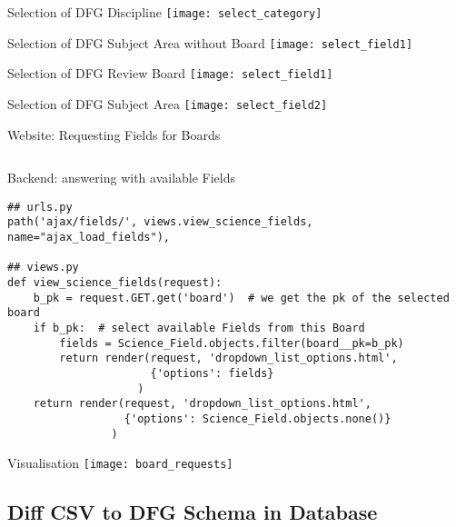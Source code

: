 
\begin{frame}[c]{Selection of DFG Discipline}
    \texttt{[image: select\_category]}
\end{frame}
\begin{frame}[c]{Selection of DFG Subject Area without Board}
    \texttt{[image: select\_field1]}
\end{frame}
\begin{frame}[c]{Selection of DFG Review Board}
    \texttt{[image: select\_field1]}
\end{frame}
\begin{frame}[c]{Selection of DFG Subject Area}
    \texttt{[image: select\_field2]}
\end{frame}


\begin{frame}[c,fragile]{Website: Requesting Fields for Boards}
    \footnotesize
    \inputminted[linenos=true]{javascript}{code/board_request.js}
\end{frame}


\begin{frame}[c,fragile]{Backend: answering with available Fields}
\footnotesize
    \begin{verbatim}
## urls.py
path('ajax/fields/', views.view_science_fields, name="ajax_load_fields"),

## views.py
def view_science_fields(request):
    b_pk = request.GET.get('board')  # we get the pk of the selected board
    if b_pk:  # select available Fields from this Board
        fields = Science_Field.objects.filter(board__pk=b_pk) 
        return render(request, 'dropdown_list_options.html',
                      {'options': fields}
                    )
    return render(request, 'dropdown_list_options.html',
                  {'options': Science_Field.objects.none()}
                )
\end{verbatim}
\end{frame}

\begin{frame}[c]{Visualisation}
    \texttt{[image: board\_requests]}
\end{frame}

\subsection{Diff CSV to DFG Schema in Database}

